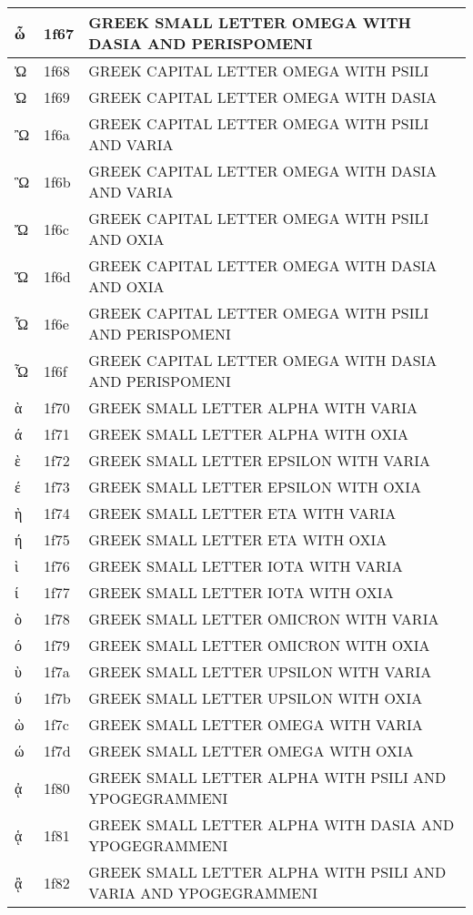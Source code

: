 \documentclass[12pt,letterpaper,openany]{book}
\begin{document}
\begin{center}
\begin{supertabular}{|m{0.25in}|m{0.5in}|m{4in}|}
ὧ & 1f67 & GREEK SMALL LETTER OMEGA WITH DASIA AND PERISPOMENI\\\hline
Ὠ & 1f68 & GREEK CAPITAL LETTER OMEGA WITH PSILI\\\hline
Ὡ & 1f69 & GREEK CAPITAL LETTER OMEGA WITH DASIA\\\hline
Ὢ & 1f6a & GREEK CAPITAL LETTER OMEGA WITH PSILI AND VARIA\\\hline
Ὣ & 1f6b & GREEK CAPITAL LETTER OMEGA WITH DASIA AND VARIA\\\hline
Ὤ & 1f6c & GREEK CAPITAL LETTER OMEGA WITH PSILI AND OXIA\\\hline
Ὥ & 1f6d & GREEK CAPITAL LETTER OMEGA WITH DASIA AND OXIA\\\hline
Ὦ & 1f6e & GREEK CAPITAL LETTER OMEGA WITH PSILI AND PERISPOMENI\\\hline
Ὧ & 1f6f & GREEK CAPITAL LETTER OMEGA WITH DASIA AND PERISPOMENI\\\hline
ὰ & 1f70 & GREEK SMALL LETTER ALPHA WITH VARIA\\\hline
ά & 1f71 & GREEK SMALL LETTER ALPHA WITH OXIA\\\hline
ὲ & 1f72 & GREEK SMALL LETTER EPSILON WITH VARIA\\\hline
έ & 1f73 & GREEK SMALL LETTER EPSILON WITH OXIA\\\hline
ὴ & 1f74 & GREEK SMALL LETTER ETA WITH VARIA\\\hline
ή & 1f75 & GREEK SMALL LETTER ETA WITH OXIA\\\hline
ὶ & 1f76 & GREEK SMALL LETTER IOTA WITH VARIA\\\hline
ί & 1f77 & GREEK SMALL LETTER IOTA WITH OXIA\\\hline
ὸ & 1f78 & GREEK SMALL LETTER OMICRON WITH VARIA\\\hline
ό & 1f79 & GREEK SMALL LETTER OMICRON WITH OXIA\\\hline
ὺ & 1f7a & GREEK SMALL LETTER UPSILON WITH VARIA\\\hline
ύ & 1f7b & GREEK SMALL LETTER UPSILON WITH OXIA\\\hline
ὼ & 1f7c & GREEK SMALL LETTER OMEGA WITH VARIA\\\hline
ώ & 1f7d & GREEK SMALL LETTER OMEGA WITH OXIA\\\hline
ᾀ & 1f80 & GREEK SMALL LETTER ALPHA WITH PSILI AND YPOGEGRAMMENI\\\hline
ᾁ & 1f81 & GREEK SMALL LETTER ALPHA WITH DASIA AND YPOGEGRAMMENI\\\hline
ᾂ & 1f82 & GREEK SMALL LETTER ALPHA WITH PSILI AND VARIA AND YPOGEGRAMMENI\\\hline

\end{supertabular}
\end{center}
\end{document}
